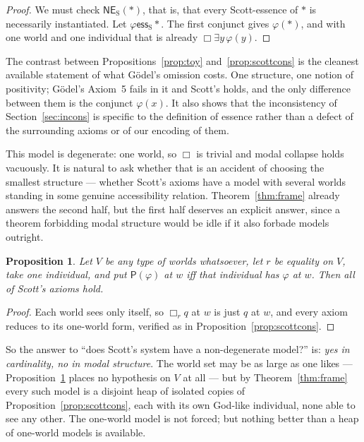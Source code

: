 \documentclass[11pt]{article}
\theoremstyle{plain}
\newtheorem{proposition}[theorem]{Proposition}
\theoremstyle{definition}
\newcommand{\esss}{\mathrel{\mathsf{ess}_{\mathrm{S}}}}
\newcommand{\NES}{\mathsf{NE}_{\mathrm{S}}}
\newcommand{\Pos}{\mathsf{P}}
\begin{document}
\begin{proof}
We must check $\NES(*)$, that is, that every Scott-essence of $*$ is
necessarily instantiated. Let $\varphi \esss *$. The first conjunct gives
$\varphi(*)$, and with one world and one individual that is already
$\Box\exists y\, \varphi(y)$.
\end{proof}

The contrast between Propositions~\ref{prop:toy} and~\ref{prop:scottcons} is
the cleanest available statement of what G\"odel's omission costs. One
structure, one notion of positivity; G\"odel's Axiom~5 fails in it and Scott's
holds, and the only difference between them is the conjunct $\varphi(x)$. It
also shows that the inconsistency of Section~\ref{sec:incons} is specific to
the definition of essence rather than a defect of the surrounding axioms or of
our encoding of them.

This model is degenerate: one world, so $\Box$ is trivial and modal collapse
holds vacuously. It is natural to ask whether that is an accident of choosing
the smallest structure --- whether Scott's axioms have a model with several
worlds standing in some genuine accessibility relation. Theorem~\ref{thm:frame}
already answers the second half, but the first half deserves an explicit
answer, since a theorem forbidding modal structure would be idle if it also
forbade models outright.

\begin{proposition}\label{prop:iso}
Let $V$ be any type of worlds whatsoever, let $r$ be equality on $V$, take one
individual, and put $\Pos(\varphi)$ at $w$ iff that individual has $\varphi$ at
$w$. Then all of Scott's axioms hold.
\end{proposition}

\begin{proof}
Each world sees only itself, so $\Box_r q$ at $w$ is just $q$ at $w$, and every
axiom reduces to its one-world form, verified as in
Proposition~\ref{prop:scottcons}.
\end{proof}

\noindent
So the answer to ``does Scott's system have a non-degenerate model?'' is:
\emph{yes in cardinality, no in modal structure}. The world set may be as large
as one likes --- Proposition~\ref{prop:iso} places no hypothesis on $V$ at all
--- but by Theorem~\ref{thm:frame} every such model is a disjoint heap of
isolated copies of Proposition~\ref{prop:scottcons}, each with its own God-like
individual, none able to see any other. The one-world model is not forced; but
nothing better than a heap of one-world models is available.
\end{document}
